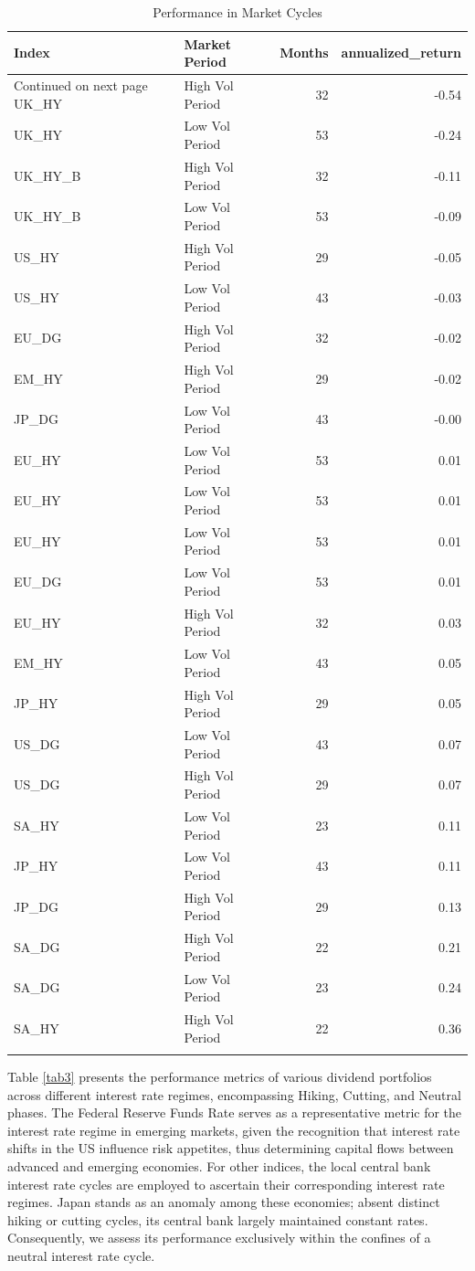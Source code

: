 \documentclass[12pt,preprint, authoryear]{elsarticle}
\numberwithin{equation}{section}
\numberwithin{figure}{section}
\numberwithin{table}{section}
\begin{document}
\begingroup\fontsize{12pt}{13pt}\selectfont
\begin{longtable}{llrr}
  \toprule
Index & Market Period & Months & annualized\_return \\ 
  \hline 
\endhead 
\hline 
{\footnotesize Continued on next page} 
\endfoot 
\endlastfoot 
 \midrule
UK\_HY & High Vol Period &  32 & -0.54 \\ 
  UK\_HY & Low Vol Period &  53 & -0.24 \\ 
  UK\_HY\_B & High Vol Period &  32 & -0.11 \\ 
  UK\_HY\_B & Low Vol Period &  53 & -0.09 \\ 
  US\_HY & High Vol Period &  29 & -0.05 \\ 
  US\_HY & Low Vol Period &  43 & -0.03 \\ 
  EU\_DG & High Vol Period &  32 & -0.02 \\ 
  EM\_HY & High Vol Period &  29 & -0.02 \\ 
  JP\_DG & Low Vol Period &  43 & -0.00 \\ 
  EU\_HY & Low Vol Period &  53 & 0.01 \\ 
  EU\_HY & Low Vol Period &  53 & 0.01 \\ 
  EU\_HY & Low Vol Period &  53 & 0.01 \\ 
  EU\_DG & Low Vol Period &  53 & 0.01 \\ 
  EU\_HY & High Vol Period &  32 & 0.03 \\ 
  EM\_HY & Low Vol Period &  43 & 0.05 \\ 
  JP\_HY & High Vol Period &  29 & 0.05 \\ 
  US\_DG & Low Vol Period &  43 & 0.07 \\ 
  US\_DG & High Vol Period &  29 & 0.07 \\ 
  SA\_HY & Low Vol Period &  23 & 0.11 \\ 
  JP\_HY & Low Vol Period &  43 & 0.11 \\ 
  JP\_DG & High Vol Period &  29 & 0.13 \\ 
  SA\_DG & High Vol Period &  22 & 0.21 \\ 
  SA\_DG & Low Vol Period &  23 & 0.24 \\ 
  SA\_HY & High Vol Period &  22 & 0.36 \\ 
   \bottomrule
\caption{Performance in Market Cycles\label{tab2}} 
\end{longtable}
\endgroup

Table \ref{tab3} presents the performance metrics of various dividend
portfolios across different interest rate regimes, encompassing Hiking,
Cutting, and Neutral phases. The Federal Reserve Funds Rate serves as a
representative metric for the interest rate regime in emerging markets,
given the recognition that interest rate shifts in the US influence risk
appetites, thus determining capital flows between advanced and emerging
economies. For other indices, the local central bank interest rate
cycles are employed to ascertain their corresponding interest rate
regimes. Japan stands as an anomaly among these economies; absent
distinct hiking or cutting cycles, its central bank largely maintained
constant rates. Consequently, we assess its performance exclusively
within the confines of a neutral interest rate cycle.
\end{document}
